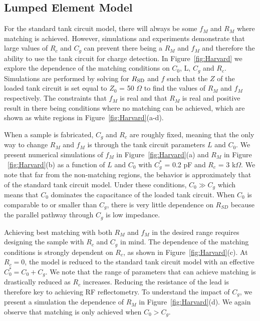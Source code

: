 \documentclass{article}
\begin{document}
	\subsection{Lumped Element Model}

	For the standard tank circuit model, there will always be some $f_M$ and $R_M$ where matching is achieved.  However, simulations and experiments demonstrate that large values of $R_c$ and $C_g$ can prevent there being a $R_M$ and $f_M$ and therefore the ability to use the tank circuit for charge detection.  In Figure\ \ref{fig:Harvard} we explore the dependence of the matching conditions on $C_0$, L, $C_g$ and $R_c$.  Simulations are performed by solving for $R_{\rm SD}$ and $f$ such that the $Z$ of the loaded tank circuit is set equal to $Z_0$ = 50 $\Omega$ to find the values of $R_M$ and $f_M$ respectively.  The constraints that $f_M$ is real and that $R_M$ is real and positive result in there being conditions where no matching can be achieved, which are shown as white regions in Figure\ \ref{fig:Harvard}(a-d).

	When a sample is fabricated, $C_g$ and $R_c$ are roughly fixed, meaning that the only way to change $R_M$ and $f_M$ is through the tank circuit parameters $L$ and $C_0$.  We present numerical simulations of $f_M$ in Figure\ \ref{fig:Harvard}(a) and $R_M$ in Figure \ \ref{fig:Harvard}(b) as a function of $L$ and $C_0$ with $C^*_g$ = 0.2 pF and $R_c$ = 3 k$\Omega$.    We note that far from the non-matching regions, the behavior is approximately that of the standard tank circuit model.  Under these conditions, $C_0\gg C_g$ which means that $C_0$ dominates the capacitance of the loaded tank circuit.  When $C_0$ is comparable to or smaller than $C_g$, there is very little dependence on $R_{SD}$ because the parallel pathway through $C_g$ is low impedance.  

	Achieving best matching with both $R_M$ and $f_M$ in the desired range requires designing the sample with $R_c$ and $C_g$ in mind.  The dependence of the matching conditions is strongly dependent on $R_c$, as shown in Figure\ \ref{fig:Harvard}(c).  At $R_c=0$, the model is reduced to the standard tank circuit model with an effective $C_0^*=C_0+C_g$.  We note that the range of parameters that can achieve matching is drastically reduced as $R_c$ increases.  Reducing the resistance of the lead is therefore key to achieving RF reflectometry.  To understand the impact of $C_g$, we present a simulation the dependence of $R_M$ in Figure\ \ref{fig:Harvard}(d).  We again observe that matching is only achieved when $C_0>C_g$.
\end{document}
